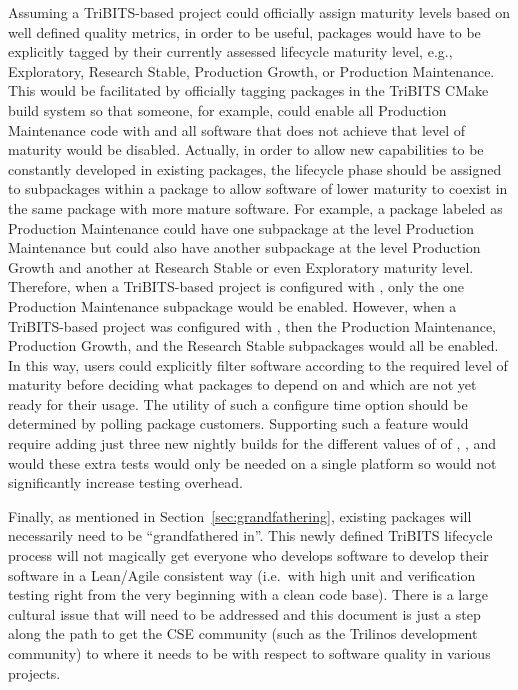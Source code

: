 \documentclass[11pt]{SANDreport}
\begin{document}
Assuming a TriBITS-based project could officially assign maturity
levels based on well defined quality metrics, in order to be useful,
packages would have to be explicitly tagged by their currently
assessed lifecycle maturity level, e.g., Exploratory, Research Stable,
Production Growth, or Production Maintenance.  This would be
facilitated by officially tagging packages in the TriBITS CMake build
system so that someone, for example, could enable all Production
Maintenance code with
{} and all software that does not achieve that
level of maturity would be disabled.  Actually, in order to allow new
capabilities to be constantly developed in existing packages, the
lifecycle phase should be assigned to subpackages within a package to
allow software of lower maturity to coexist in the same package with
more mature software.  For example, a package labeled as Production
Maintenance could have one subpackage at the level Production
Maintenance but could also have another subpackage at the level
Production Growth and another at Research Stable or even Exploratory
maturity level.  Therefore, when a TriBITS-based project is configured
with {}, only the one Production Maintenance
subpackage would be enabled.  However, when a TriBITS-based project
was configured with {}, then the Production Maintenance, Production
Growth, and the Research Stable subpackages would all be enabled.  In
this way, users could explicitly filter software according to the
required level of maturity before deciding what packages to depend on
and which are not yet ready for their usage.  The utility of such a
configure time option should be determined by polling package
customers.  Supporting such a feature would require adding just three
new nightly builds for the different values of
{} of
{}, {}, and
{} would these extra tests would only be
needed on a single platform so would not significantly increase
testing overhead.

Finally, as mentioned in Section~\ref{sec:grandfathering}, existing
packages will necessarily need to be ``grandfathered in''.  This newly
defined TriBITS lifecycle process will not magically get everyone who
develops software to develop their software in a Lean/Agile consistent
way (i.e.\ with high unit and verification testing right from the very
beginning with a clean code base).  There is a large cultural issue
that will need to be addressed and this document is just a step along
the path to get the CSE community (such as the Trilinos development
community) to where it needs to be with respect to software quality in
various projects.
\end{document}
